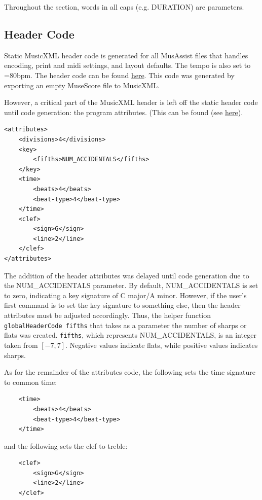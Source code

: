 \documentclass{report}
\begin{document}
Throughout the section, words in all caps (e.g. DURATION) are parameters.

\subsection{Header Code}
\label{sec:xmlheader}
Static MusicXML header code is generated for all MusAssist files that handles encoding, print and midi settings, and layout defaults. The tempo is also set to \musQuarter=80bpm. The header code can be found \href{https://github.com/ilanashapiro/MusAssist/blob/main/app/Compile.hs}{here}. This code was generated by exporting an empty MuseScore file to MusicXML.

However, a critical part of the MusicXML header is left off the static header code until code generation: the program attributes. (This can be found (see \href{https://github.com/ilanashapiro/MusAssist/blob/main/app/MusicXMLgen.hs}{here}).

\begin{verbatim}
<attributes>
    <divisions>4</divisions>
    <key>
        <fifths>NUM_ACCIDENTALS</fifths>
    </key>
    <time>
        <beats>4</beats>
        <beat-type>4</beat-type>
    </time>
    <clef>
        <sign>G</sign>
        <line>2</line>
    </clef>
</attributes>
\end{verbatim}

The addition of the header attributes was delayed until code generation due to the NUM\_ACCIDENTALS parameter. By default, NUM\_ACCIDENTALS is set to zero, indicating a key signature of C major/A minor. However, if the user's first command is to set the key signature to something else, then the header attributes must be adjusted accordingly. Thus, the helper function \verb.globalHeaderCode fifths. that takes as a parameter the number of sharps or flats was created. \verb.fifths., which represents NUM\_ACCIDENTALS, is an integer taken from $[-7,7]$. Negative values indicate flats, while positive values indicates sharps.

As for the remainder of the attributes code, the following sets the time signature to common time:
\begin{verbatim}
    <time>
        <beats>4</beats>
        <beat-type>4</beat-type>
    </time>
\end{verbatim}

\noindent and the following sets the clef to treble:
\begin{verbatim}
    <clef>
        <sign>G</sign>
        <line>2</line>
    </clef>
\end{verbatim}
\end{document}
